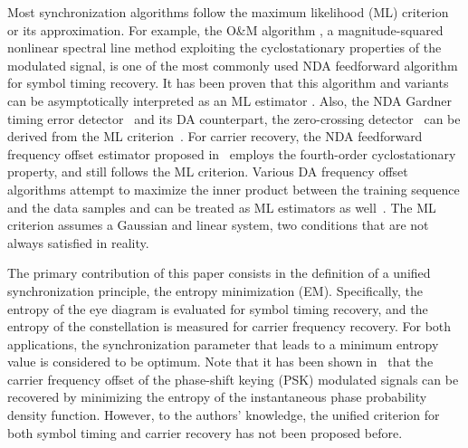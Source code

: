 \documentclass[journal,comsoc, onecolumn, 12pt,draftclsnofoot]{IEEEtran} %
\begin{document}
Most synchronization algorithms follow the maximum likelihood (ML) criterion or its approximation.
For example, the O\&M algorithm \cite{Oerder1988}, a magnitude-squared nonlinear spectral line method exploiting the cyclostationary properties of the modulated signal, is one of the most commonly used NDA feedforward algorithm for symbol timing recovery.
It has been proven that this algorithm and variants can be asymptotically interpreted as an ML estimator \cite{YanWang2002,Lopez-Salcedo2006}.
Also, the NDA Gardner timing error detector~\cite{Gardner1986} and its DA counterpart, the zero-crossing detector~\cite{gardner1988demodulator} can be derived from the ML criterion~\cite{Oerder1987}.
For carrier recovery, the NDA feedforward frequency offset estimator proposed in~\cite{Wang2004} employs the fourth-order cyclostationary property, and still follows the ML criterion.
Various DA frequency offset algorithms attempt to maximize the inner product between the  training sequence and the data samples and can be treated as ML estimators as well~\cite{mengali1997synchronization}.
The ML criterion assumes a Gaussian and linear system, two conditions that are not always satisfied in reality. 

The primary contribution of this paper consists in the definition of a unified synchronization principle, the entropy minimization (EM). 
Specifically, the entropy of the eye diagram is evaluated for symbol timing recovery, and the entropy of the constellation is measured for carrier frequency recovery.
For both applications, the synchronization parameter that leads to a minimum entropy value is considered to be optimum.
Note that it has been shown in~\cite{Pedzisz2006} that the carrier frequency offset of the phase-shift keying (PSK) modulated signals can be recovered by minimizing the entropy of the instantaneous phase probability density function.
However, to the authors' knowledge,  the unified criterion for both symbol timing and carrier recovery has not been proposed before. 
\end{document}
